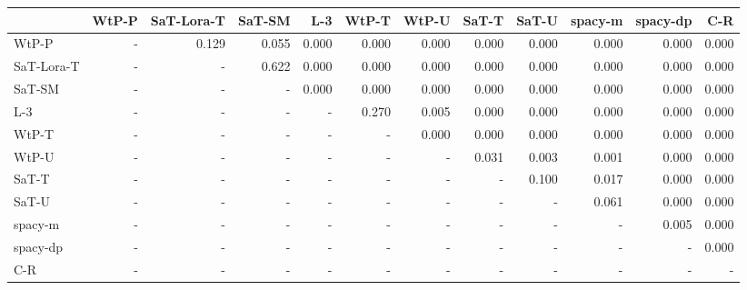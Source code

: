 \begin{tabular}{lrrrrrrrrrrr}
\toprule
 & WtP-P & SaT-Lora-T & SaT-SM & L-3 & WtP-T & WtP-U & SaT-T & SaT-U & spacy-m & spacy-dp & C-R \\
\midrule
WtP-P & - & 0.129 & 0.055 & 0.000 & 0.000 & 0.000 & 0.000 & 0.000 & 0.000 & 0.000 & 0.000 \\
SaT-Lora-T & - & - & 0.622 & 0.000 & 0.000 & 0.000 & 0.000 & 0.000 & 0.000 & 0.000 & 0.000 \\
SaT-SM & - & - & - & 0.000 & 0.000 & 0.000 & 0.000 & 0.000 & 0.000 & 0.000 & 0.000 \\
L-3 & - & - & - & - & 0.270 & 0.005 & 0.000 & 0.000 & 0.000 & 0.000 & 0.000 \\
WtP-T & - & - & - & - & - & 0.000 & 0.000 & 0.000 & 0.000 & 0.000 & 0.000 \\
WtP-U & - & - & - & - & - & - & 0.031 & 0.003 & 0.001 & 0.000 & 0.000 \\
SaT-T & - & - & - & - & - & - & - & 0.100 & 0.017 & 0.000 & 0.000 \\
SaT-U & - & - & - & - & - & - & - & - & 0.061 & 0.000 & 0.000 \\
spacy-m & - & - & - & - & - & - & - & - & - & 0.005 & 0.000 \\
spacy-dp & - & - & - & - & - & - & - & - & - & - & 0.000 \\
C-R & - & - & - & - & - & - & - & - & - & - & - \\
\bottomrule
\end{tabular}

